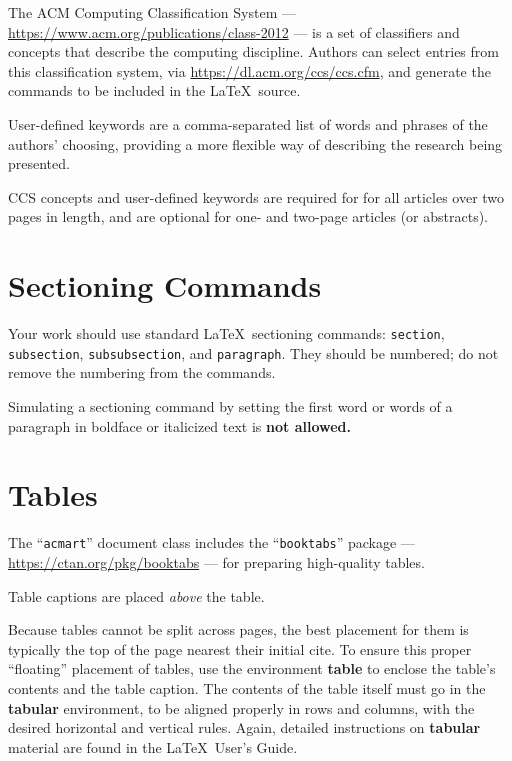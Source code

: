 \documentclass[
  letterpaper,
  DIV=11,
  numbers=noendperiod]{scrartcl}
\begin{document}
The ACM Computing Classification System ---
\url{https://www.acm.org/publications/class-2012} --- is a set of
classifiers and concepts that describe the computing discipline. Authors
can select entries from this classification system, via
\url{https://dl.acm.org/ccs/ccs.cfm}, and generate the commands to be
included in the \LaTeX~source.

User-defined keywords are a comma-separated list of words and phrases of
the authors' choosing, providing a more flexible way of describing the
research being presented.

CCS concepts and user-defined keywords are required for for all articles
over two pages in length, and are optional for one- and two-page
articles (or abstracts).

\hypertarget{sectioning-commands}{%
\section{Sectioning Commands}\label{sectioning-commands}}

Your work should use standard \LaTeX~sectioning commands:
\texttt{section}, \texttt{subsection}, \texttt{subsubsection}, and
\texttt{paragraph}. They should be numbered; do not remove the numbering
from the commands.

Simulating a sectioning command by setting the first word or words of a
paragraph in boldface or italicized text is \textbf{not allowed.}

\hypertarget{tables}{%
\section{Tables}\label{tables}}

The ``\texttt{acmart}'' document class includes the
``\texttt{booktabs}'' package --- \url{https://ctan.org/pkg/booktabs}
--- for preparing high-quality tables.

Table captions are placed \emph{above} the table.

Because tables cannot be split across pages, the best placement for them
is typically the top of the page nearest their initial cite. To ensure
this proper ``floating'' placement of tables, use the environment
\textbf{table} to enclose the table's contents and the table caption.
The contents of the table itself must go in the \textbf{tabular}
environment, to be aligned properly in rows and columns, with the
desired horizontal and vertical rules. Again, detailed instructions on
\textbf{tabular} material are found in the \LaTeX~User's Guide.
\end{document}
